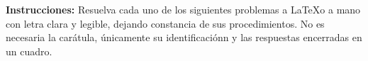 

\usepackage{fancyhdr}%
\pagestyle{fancy}%
\fancyhead{}
\fancyhead[R]{\footnotesize{\thepage}}
\fancyfoot{}
\usepackage{fourier-orns}

\renewcommand\footrule{%
\hrulefill
\raisebox{-2.1pt}
{\quad\decosix\quad}%
\hrulefill}


\begin{titlepage}


\noindent \textbf{Instrucciones: } Resuelva cada uno de los siguientes problemas a \LaTeX  o a mano con letra clara y legible, dejando constancia de sus procedimientos. No es necesaria la carátula, únicamente su identificaciónn y las respuestas encerradas en un cuadro.



\end{titlepage}

